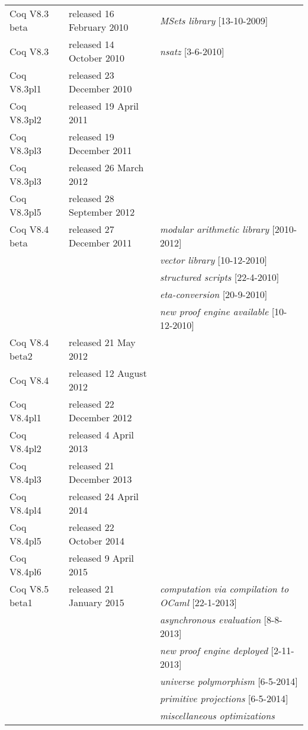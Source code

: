 \documentclass[a4paper]{book}
\newcommand{\feature}[1]{{\em #1}}
\begin{document}
\newpage
\mbox{}\\
\mbox{}\\
\begin{tabular}{l|l|l}
Coq V8.3 beta & released 16 February 2010 & \feature{MSets library} [13-10-2009] \\
Coq V8.3 & released 14 October 2010 & \feature{nsatz} [3-6-2010] \\
Coq V8.3pl1& released 23 December 2010 & \\
Coq V8.3pl2& released 19 April 2011 & \\
Coq V8.3pl3& released 19 December 2011 & \\
Coq V8.3pl3& released 26 March 2012 & \\
Coq V8.3pl5& released 28 September 2012 & \\
Coq V8.4 beta & released 27 December 2011 &  \feature{modular arithmetic library} [2010-2012]\\
&& \feature{vector library} [10-12-2010]\\
&& \feature{structured scripts} [22-4-2010]\\
&& \feature{eta-conversion} [20-9-2010]\\
&& \feature{new proof engine available} [10-12-2010]\\
Coq V8.4 beta2 & released 21 May 2012 & \\
Coq V8.4 & released 12 August 2012 &\\
Coq V8.4pl1& released 22 December 2012 & \\
Coq V8.4pl2& released 4 April 2013 & \\
Coq V8.4pl3& released 21 December 2013 & \\
Coq V8.4pl4& released 24 April 2014 & \\
Coq V8.4pl5& released 22 October 2014 & \\
Coq V8.4pl6& released 9 April 2015 & \\

Coq V8.5 beta1 & released 21 January 2015 & \feature{computation via compilation to OCaml} [22-1-2013]\\
&& \feature{asynchronous evaluation} [8-8-2013]\\
&& \feature{new proof engine deployed} [2-11-2013]\\
&& \feature{universe polymorphism} [6-5-2014]\\
&& \feature{primitive projections} [6-5-2014]\\
&& \feature{miscellaneous optimizations}\\


\end{tabular}
\end{document}
